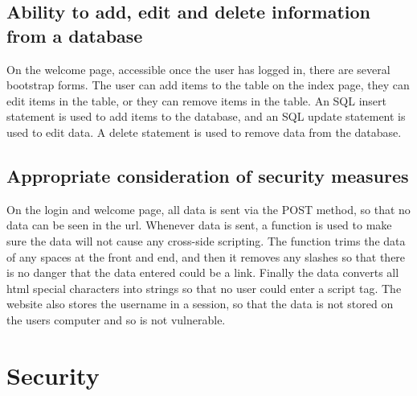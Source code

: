 \documentclass[12pt,a4paper]{article}
\begin{document}
		\subsection{Ability to add, edit and delete information from a database}
		On the welcome page, accessible once the user has logged in, there are several bootstrap forms. The user can add items to the table on the index page, they can edit items in the table, or they can remove items in the table. An SQL insert statement is used to add items to the database, and an SQL update statement is used to edit data. A delete statement is used to remove data from the database.

		\subsection{Appropriate consideration of security measures}
		On the login and welcome page, all data is sent via the POST method, so that no data can be seen in the url. Whenever data is sent, a function is used to make sure the data will not cause any cross-side scripting. The function trims the data of any spaces at the front and end, and then it removes any slashes so that there is no danger that the data entered could be a link. Finally the data converts all html special characters into strings so that no user could enter a script tag. The website also stores the username in a session, so that the data is not stored on the users computer and so is not vulnerable.

	\clearpage


	\section{Security}
\end{document}
